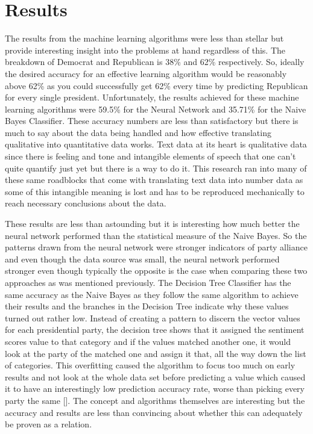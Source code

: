 \section{Results}
The results from the machine learning algorithms were less than stellar but provide interesting insight into the problems at hand regardless of this.
The breakdown of Democrat and Republican is 38\% and 62\% respectively.
So, ideally the desired accuracy for an effective learning algorithm would be reasonably above 62\% as you could successfully get 62\% every time by predicting Republican for every single president.
Unfortunately, the results achieved for these machine learning algorithms were 59.5\% for the Neural Network and 35.71\% for the Naive Bayes Classifier.
These accuracy numbers are less than satisfactory but there is much to say about the data being handled and how effective translating qualitative into quantitative data works.
Text data at its heart is qualitative data since there is feeling and tone and intangible elements of speech that one can't quite quantify just yet but there is a way to do it.
This research ran into many of these same roadblocks that come with translating text data into number data as some of this intangible meaning is lost and has to be reproduced mechanically to reach necessary conclusions about the data.

These results are less than astounding but it is interesting how much better the neural network performed than the statistical measure of the Naive Bayes.
So the patterns drawn from the neural network were stronger indicators of party alliance and even though the data source was small, the neural network performed stronger even though typically the opposite is the case when comparing these two approaches as was mentioned previously.
The Decision Tree Classifier has the same accuracy as the Naive Bayes as they follow the same algorithm to achieve their results and the branches in the Decision Tree indicate why these values turned out rather low.
Instead of creating a pattern to discern the vector values for each presidential party, the decision tree shows that it assigned the sentiment scores value to that category and if the values matched another one, it would look at the party of the matched one and assign it that, all the way down the list of categories.
This overfitting caused the algorithm to focus too much on early results and not look at the whole data set before predicting a value which caused it to have an interestingly low prediction accuracy rate, worse than picking every party the same [\cite{dietterich1995overfitting}].
The concept and algorithms themselves are interesting but the accuracy and results are less than convincing about whether this can adequately be proven as a relation.

